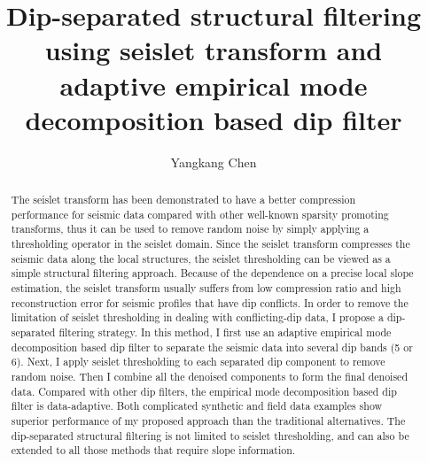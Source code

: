
\title{Dip-separated structural filtering using seislet transform and adaptive empirical mode decomposition based dip filter}

\renewcommand{\thefootnote}{\fnsymbol{footnote}}
\author{Yangkang Chen}

\address{
Bureau of Economic Geology \\
John A. and Katherine G. Jackson School of Geosciences \\
The University of Texas at Austin \\
University Station, Box X \\
Austin, TX 78713-8924 \\
ykchen@utexas.edu
}

\maketitle

\DeclareRobustCommand{\dlo}[1]{}
\DeclareRobustCommand{\wen}[1]{#1}
  
\begin{abstract}
The seislet transform has been demonstrated to have a better compression performance for seismic data compared with other well-known sparsity promoting transforms, thus it can be used to remove random noise by simply applying a thresholding operator in the seislet domain. Since the seislet transform compresses the seismic data along the local structures, the seislet thresholding can be viewed as \dlo{the simplest}\wen{a simple} structural filtering approach. Because of the dependence on a precise local slope estimation, the seislet transform usually suffers from low compression ratio and high reconstruction error for seismic profiles that have dip conflicts. In order to remove the limitation of seislet thresholding in dealing with conflicting-dip data, I propose a \dlo{semi-automatic} dip-separated filtering strategy. In this method, I first use an adaptive empirical mode decomposition based dip filter to separate the seismic data into several dip bands (5 or 6). Next, I apply seislet thresholding to each separated dip component to remove random noise. Then I combine all the denoised components to form the final denoised data. Compared with other dip filters, the empirical mode decomposition based dip filter is data-adaptive. Both complicated synthetic and field data examples show superior performance of my proposed approach than the traditional alternatives. The dip-separated structural filtering is not limited to seislet thresholding, and can also be extended to all those methods that require slope information.
\end{abstract}


